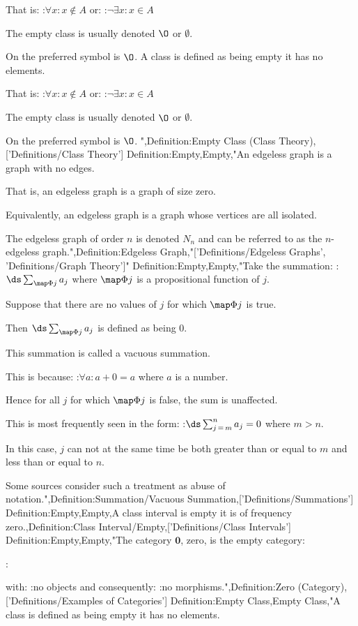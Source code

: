 That is:
:$\forall x: x \notin A$
or:
:$\neg \exists x: x \in A$


The empty class is usually denoted $\O$ or $\emptyset$.

On  the preferred symbol is $\O$.
A class is defined as being empty  it has no elements.

That is:
:$\forall x: x \notin A$
or:
:$\neg \exists x: x \in A$


The empty class is usually denoted $\O$ or $\emptyset$.

On  the preferred symbol is $\O$.
",Definition:Empty Class (Class Theory),['Definitions/Class Theory']
Definition:Empty,Empty,"An edgeless graph is a graph with no edges.

That is, an edgeless graph is a graph of size zero.

Equivalently, an edgeless graph is a graph whose vertices are all isolated.


The edgeless graph of order $n$ is denoted $N_n$ and can be referred to as the $n$-edgeless graph.",Definition:Edgeless Graph,"['Definitions/Edgeless Graphs', 'Definitions/Graph Theory']"
Definition:Empty,Empty,"Take the summation:
:$\ds \sum_{\map \Phi j} a_j$
where $\map \Phi j$ is a propositional function of $j$.

Suppose that there are no values of $j$ for which $\map \Phi j$ is true.

Then $\ds \sum_{\map \Phi j} a_j$ is defined as being $0$.

This summation is called a vacuous summation.


This is because:
:$\forall a: a + 0 = a$
where $a$ is a number.

Hence for all $j$ for which $\map \Phi j$ is false, the sum is unaffected.


This is most frequently seen in the form:
:$\ds \sum_{j \mathop = m}^n a_j = 0$
where $m > n$.

In this case, $j$ can not at the same time be both greater than or equal to $m$ and less than or equal to $n$.


Some sources consider such a treatment as abuse of notation.",Definition:Summation/Vacuous Summation,['Definitions/Summations']
Definition:Empty,Empty,A class interval is empty  it is of frequency zero.,Definition:Class Interval/Empty,['Definitions/Class Intervals']
Definition:Empty,Empty,"The category $\mathbf 0$, zero, is the empty category:


:$\qquad$


with:
:no objects
and consequently:
:no morphisms.",Definition:Zero (Category),['Definitions/Examples of Categories']
Definition:Empty Class,Empty Class,"A class is defined as being empty  it has no elements.

